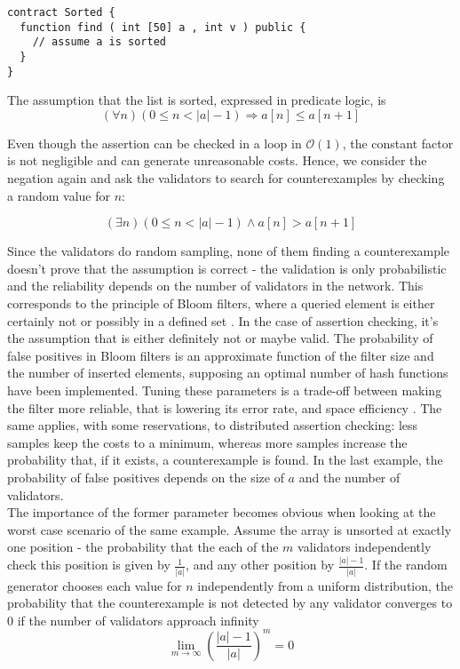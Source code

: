 \begin{lstlisting}[caption=Smart Contract expecting a sorted array, numbers=none, language=Solidity, label=lst:sorted]
contract Sorted {
  function find ( int [50] a , int v ) public {
    // assume a is sorted
  }
}
\end{lstlisting}
 
The assumption that the list is sorted, expressed in predicate logic, is
\begin{equation}\label{eq:sorted}
	(\forall n) (0 \leq n < |a| - 1) \Rightarrow a[n] \leq a[n+1]
\end{equation}

Even though the assertion can be checked in a loop in $\mathcal{O}(1)$, the constant factor is not negligible and can generate unreasonable costs. Hence, we consider the negation again and ask the validators to search for counterexamples by checking a random value for $n$:
 
\begin{equation}\label{eq:sorted_neg}
	(\exists n) (0 \leq n < |a| - 1) \wedge a[n] > a[n+1]
\end{equation}

Since the validators do random sampling, none of them finding a counterexample doesn't prove that the assumption is correct - the validation is only probabilistic and the reliability depends on the number of validators in the network. This corresponds to the principle of Bloom filters, where a queried element is either certainly not or possibly in a defined set \cite{blustein_bloom_2002}. In the case of assertion checking, it's the assumption that is either definitely not or maybe valid. The probability of false positives in Bloom filters is an approximate function of the filter size and the number of inserted elements, supposing an optimal number of hash functions have been implemented. Tuning these parameters is a trade-off between making the filter more reliable, that is lowering its error rate, and space efficiency \cite{blustein_bloom_2002}. The same applies, with some reservations, to distributed assertion checking: less samples keep the costs to a minimum, whereas more samples increase the probability that, if it exists, a counterexample is found. In the last example, the probability of false positives depends on the size of $a$ and the number of validators.\\
The importance of the former parameter becomes obvious when looking at the worst case scenario of the same example. Assume the array is unsorted at exactly one position - the probability that the each of the $m$ validators independently check this position is given by $\frac{1}{|a|}$, and any other position by $\frac{|a|-1}{|a|}$. If the random generator chooses each value for $n$ independently from a uniform distribution, the probability that the counterexample is not detected by any validator converges to 0 if the number of validators approach infinity \cite{thiemann_2020}
\begin{equation}\label{eq:limes_validators}
	\lim_{m\to\infty} \left(\frac{|a|-1}{|a|}\right)^m = 0
\end{equation}

